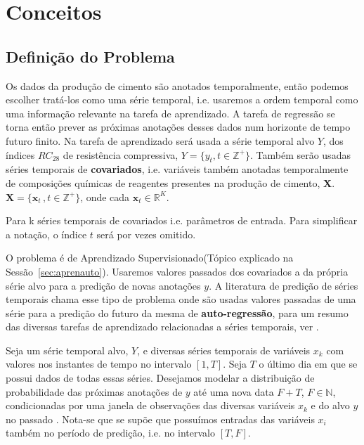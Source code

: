 \chapter{Conceitos}
\label{cap:conceitos}


\section{Definição do Problema}


Os dados da produção de cimento são anotados temporalmente, então podemos escolher
tratá-los como uma série temporal, i.e. usaremos a ordem temporal como uma informação
relevante na tarefa de aprendizado.
A tarefa de regressão se torna então prever as próximas anotações desses
dados num horizonte de tempo futuro finito.
Na tarefa de aprendizado será usada a série temporal alvo $Y$, dos índices
$RC_{28}$ de resistência compressiva, $Y = \{y_t , t \in \mathbb{Z}^+ \}$.
Também serão usadas séries temporais de
\textbf{covariados}, i.e. variáveis também anotadas temporalmente de composições
químicas de reagentes presentes na produção de cimento, $\textbf{X}$. $\textbf{X} = \{ \textbf{x}_t  \, , t
\in \mathbb{Z}^+  \}$, onde cada $\textbf{x}_t \in \mathbb{R}^K$.

Para k séries temporais de covariados i.e. parâmetros de
entrada. Para simplificar a notação, o índice $t$ será por vezes omitido.

O problema é de Aprendizado Supervisionado(Tópico explicado na
Sessão~\ref{sec:aprenauto}). Usaremos valores passados dos covariados a da
própria série alvo para a predição de novas anotações $y$. A literatura de predição de séries
temporais chama esse tipo de problema onde são usadas valores passadas de uma série
para a predição do futuro da mesma de \textbf{auto-regressão}, para um resumo
das diversas tarefas de aprendizado relacionadas a séries temporais, ver \cite{gluonts}.


Seja um série temporal alvo, $Y$, e diversas séries temporais de variáveis
 $x_k$ com valores nos instantes de tempo no intervalo $[1,T]$. Seja $T$ o último dia em que se possui dados de todas essas
séries. Desejamos modelar a distribuição de probabilidade das próximas anotações
de $y$ até uma nova data $F + T$, $F \in \mathbb{N}$, condicionadas por uma janela de
observações das diversas variáveis  $x_k$ e do alvo $y$ no passado
\citep{deepfactors}. Nota-se que se supõe que possuímos entradas das
variáveis $x_i$ também no período de predição, i.e. no intervalo $[T,F]$.

